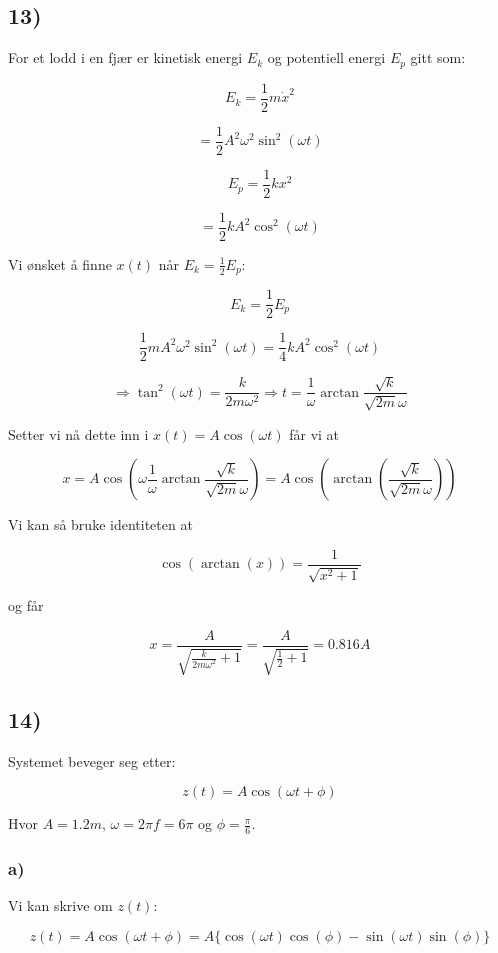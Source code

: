 \documentclass[a4paper,norsk, 10pt]{article}
\begin{document}
\subsection*{13)}
For et lodd i en fjær er kinetisk energi $E_k$ og potentiell energi $E_p$ gitt som:

\begin{equation}
E_k = \frac{1}{2}m \dot{x}^2
\end{equation}\label{eq:ek}

$$
= \frac{1}{2}A^2 \omega^2 \sin^2(\omega t) 
$$

\begin{equation}
E_p = \frac{1}{2}kx^2
\end{equation}\label{eq:ep}

$$
= \frac{1}{2}kA^2 \cos^{2}(\omega t)
$$

Vi ønsket å finne $x(t)$ når $E_k = \frac{1}{2} E_p$:

$$
E_k = \frac{1}{2} E_p
$$

$$
\frac{1}{2}mA^2 \omega^2 \sin^2(\omega t)  = \frac{1}{4}kA^2 \cos^{2}(\omega t)
$$

$$
\Rightarrow \tan^2(\omega t) = \frac{k}{2m\omega^2} \Rightarrow t = \frac{1}{\omega} \arctan \frac{\sqrt{k}}{\sqrt{2m}\omega}
$$

Setter vi nå dette inn i $x(t) = A\cos(\omega t)$ får vi at

$$
x = A\cos(\omega \frac{1}{\omega} \arctan \frac{\sqrt{k}}{\sqrt{2m}\omega}) = A\cos(\arctan(\frac{\sqrt{k}}{\sqrt{2m}\omega}))
$$

Vi kan så bruke identiteten at

$$
\cos(\arctan(x)) = \frac{1}{\sqrt{x^2 + 1}}
$$

og får

$$
x = \frac{A}{\sqrt{\frac{k}{2m\omega ^2}+1}} = \frac{A}{\sqrt{\frac{1}{2}+1}} = 0.816A
$$

\subsection*{14)}
Systemet beveger seg etter:

$$
z(t) = A\cos(\omega t + \phi)
$$

Hvor $A = 1.2m$, $\omega = 2\pi f = 6\pi$ og $\phi = \frac{\pi}{6}$.
\subsubsection*{a)}
Vi kan skrive om $z(t)$:

$$
z(t) = A\cos(\omega t + \phi) = A\{\cos(\omega t)\cos(\phi) - \sin(\omega t)\sin(\phi)\}
$$
\end{document}
